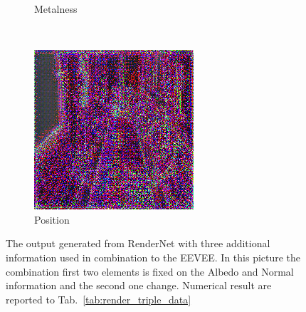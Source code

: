 \begin{figure}[h!]
\begin{subfigure}[b]{0.175\textwidth}
     \caption{Metalness}
    \end{subfigure}
    ~
    \begin{subfigure}[b]{0.175\textwidth}
     \includegraphics[width=\textwidth]{figures/result/triple/albedo_normal_position/2.png}
     \caption{Position}
    \end{subfigure}
    \caption{The output generated from RenderNet with three additional information used in combination to the EEVEE. In this picture the combination first two elements is fixed on the Albedo and Normal information and the second one change. Numerical result are reported to Tab.~\ref{tab:render_triple_data}}
    \label{fig:triple_input_base_albedo_normal}
\end{figure}

